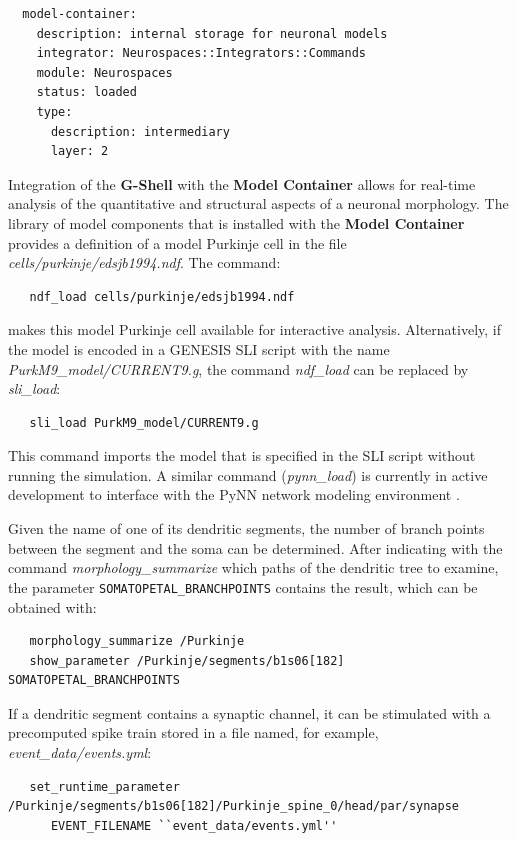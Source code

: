 \documentclass[10pt]{article}
\begin{document}
\begin{verbatim}
  model-container:
    description: internal storage for neuronal models
    integrator: Neurospaces::Integrators::Commands
    module: Neurospaces
    status: loaded
    type:
      description: intermediary
      layer: 2
\end{verbatim}

Integration of the {\bf G-Shell} with the {\bf Model Container}
allows for real-time analysis of the quantitative and structural
aspects of a neuronal morphology.  The library of model components
that is installed with the {\bf Model Container} provides a
definition of a model Purkinje cell in the file {\it
  cells/purkinje/edsjb1994.ndf}.  The command:
\begin{verbatim}
   ndf_load cells/purkinje/edsjb1994.ndf
\end{verbatim}
makes this model Purkinje cell available for interactive analysis.
Alternatively, if the model is encoded in a GENESIS SLI script with the
name {\it PurkM9\_model/CURRENT9.g}, the command {\it ndf\_load} can be
replaced by {\it sli\_load}:

\begin{verbatim}
   sli_load PurkM9_model/CURRENT9.g
\end{verbatim}

This command imports the model that is specified in the SLI script
without running the simulation.  A similar command ({\it pynn\_load})
is currently in active development to interface with the PyNN network modeling
environment \cite{davison08:_pynn}.

Given the name of one of its dendritic segments, the number of branch
points between the segment and the soma can be determined. After
indicating with the command {\it morphology\_summarize} which paths of the dendritic tree to examine, the
parameter {\tt SOMATOPETAL\_BRANCHPOINTS} contains the result, which
can be obtained with:

\begin{verbatim}
   morphology_summarize /Purkinje
   show_parameter /Purkinje/segments/b1s06[182] SOMATOPETAL_BRANCHPOINTS
\end{verbatim}

If a dendritic segment contains a synaptic channel, it can be
stimulated with a precomputed spike train stored in a file named, for
example, {\it event\_data/events.yml}:

\begin{verbatim}
   set_runtime_parameter /Purkinje/segments/b1s06[182]/Purkinje_spine_0/head/par/synapse
      EVENT_FILENAME ``event_data/events.yml''
\end{verbatim}
\end{document}
